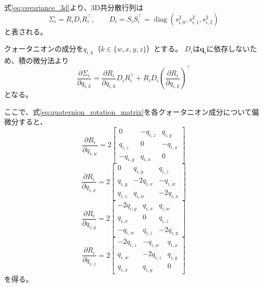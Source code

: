 \documentclass[dvipdfmx]{jlreq}
\begin{document}
式\eqref{eq:covariance_3d}より、3D共分散行列は
\begin{equation}
    \Sigma_i = R_iD_iR_i^{\top}, \qquad D_i = S_iS_i^{\top} = \operatorname{diag}\left(s_{i,0}^2,s_{i,1}^2,s_{i,2}^2\right)
    \label{eq:backward_3d_covariance}
\end{equation}
と表される。

クォータニオンの成分を$q_{i,k}$（$k\in\{w,x,y,z\}$）とする。
$D_i$は$\bm{q}_i$に依存しないため、積の微分法より
\begin{equation}
    \frac{\partial\Sigma_i}{\partial q_{i,k}} = \frac{\partial R_i}{\partial q_{i,k}} D_iR_i^{\top} + R_iD_i \left(\frac{\partial R_i}{\partial q_{i,k}}\right)^{\top}
    \label{eq:covariance_quaternion_matrix_derivative}
\end{equation}
となる。

ここで、式\eqref{eq:quaternion_rotation_matrix}を各クォータニオン成分について偏微分すると、
\begin{equation}
    \frac{\partial R_i}{\partial q_{i,w}} =
    2\begin{bmatrix}
        0 & -q_{i,z} & q_{i,y} \\
        q_{i,z} & 0 & -q_{i,x} \\
        -q_{i,y} & q_{i,x} & 0
    \end{bmatrix}
    \label{eq:rotation_qw_jacobian}
\end{equation}
\begin{equation}
    \frac{\partial R_i}{\partial q_{i,x}}
    =
    2\begin{bmatrix}
        0 & q_{i,y} & q_{i,z} \\
        q_{i,y} & -2q_{i,x} & -q_{i,w} \\
        q_{i,z} & q_{i,w} & -2q_{i,x}
    \end{bmatrix}
    \label{eq:rotation_qx_jacobian}
\end{equation}
\begin{equation}
    \frac{\partial R_i}{\partial q_{i,y}}
    =
    2\begin{bmatrix}
        -2q_{i,y} & q_{i,x} & q_{i,w} \\
        q_{i,x} & 0 & q_{i,z} \\
        -q_{i,w} & q_{i,z} & -2q_{i,y}
    \end{bmatrix}
    \label{eq:rotation_qy_jacobian}
\end{equation}
\begin{equation}
    \frac{\partial R_i}{\partial q_{i,z}}
    =
    2\begin{bmatrix}
        -2q_{i,z} & -q_{i,w} & q_{i,x} \\
        q_{i,w} & -2q_{i,z} & q_{i,y} \\
        q_{i,x} & q_{i,y} & 0
    \end{bmatrix}
    \label{eq:rotation_qz_jacobian}
\end{equation}
を得る。
\end{document}
